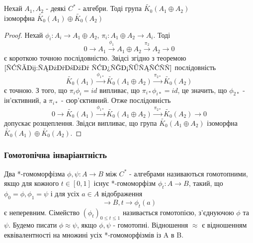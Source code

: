 \begin{theorem}
    Нехай $A_1, A_2$ - деякі $C^*$ - алгебри.
    Тоді група $\widetilde{K_0}(A_1 \oplus A_2)$ \\
    ізоморфна $\widetilde{K_0}(A_1) \oplus \widetilde{K_0}(A_2)$

    \begin{proof}
        Нехай $\phi_i: A_i \rightarrow A_1 \oplus A_2$, $\pi_i: A_1 \oplus A_2 \rightarrow A_i$.
        Тоді
        \begin{equation*}
            0 \rightarrow A_1 \xrightarrow{\phi_1} A_1 \oplus A_2 \xrightarrow{\pi_2} A_2 \rightarrow 0
        \end{equation*}
        є короткою точною послідовністю.
        Звідсі згідно з теоремою $\ref{трм:слабка точність}$ послідовність
        \begin{equation*}
            \widetilde{K_0}(A_1) \xrightarrow{\phi_{1*}} \widetilde{K_0}(A_1 \oplus A_2) \xrightarrow{\pi_{2*}} \widetilde{K_0}(A_2)
        \end{equation*}
        є точною.
        З того, що $\pi_i \phi_i = id$ випливає, що $\pi_{i*} \phi_{i*} = id$, це значить,
        що $\phi_{2*}$ - ін'єктивний, а $\pi_{i*}$ - сюр'єктивний.
        Отже послідовність
        \begin{equation*}
            0 \rightarrow \widetilde{K_0}(A_1) \xrightarrow{\phi_{1*}} \widetilde{K_0}(A_1 \oplus A_2)
            \xrightarrow{\pi_{2*}} \widetilde{K_0}(A_2) \rightarrow 0
        \end{equation*}
        допускає розщеплення.
        Звідси випливає, що група $\widetilde{K_0}(A_1 \oplus A_2)$ ізоморфна \\ $\widetilde{K_0}(A_1) \oplus \widetilde{K_0}(A_2)$.
    \end{proof}
\end{theorem}

\subsubsection{Гомотопічна інваріантність}

\begin{definition}
    Два *-гомоморфізма $\phi, \psi: A \rightarrow B$ між $C^*$ - алгебрами називаються гомотопними,
    якщо для кожного $t \in [0,1]$ існує *-гомоморфізм $\phi_t: A \rightarrow B$, такий, що
    $\phi_0 = \phi, \phi_1 = \psi$ і для усіх $a \in A$ відображення
    \begin{equation*}
    [0,1]
        \rightarrow B, t \rightarrow \phi_t(a)
    \end{equation*}
    є неперевним.
    Сімейство $(\phi_t)_{0 \leq t \leq 1}$ називається гомотопією, з'єднуючою $\phi$ та $\psi$.
    Будемо писати $\phi \approx \psi$, якщо $\phi, \psi$ - гомотопні.
    Відношення $\approx$ є відношенням еквівалентності на множині усіх *-гомоморфізмів із A в B.
\end{definition}

